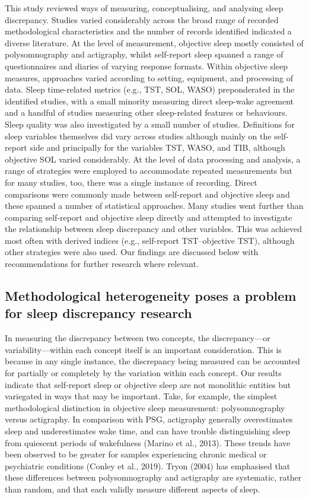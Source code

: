 \documentclass[
]{article}
\begin{document}
This study reviewed ways of measuring, conceptualising, and analysing sleep discrepancy. Studies varied considerably across the broad range of recorded methodological characteristics and the number of records identified indicated a diverse literature. At the level of measurement, objective sleep mostly consisted of polysomnography and actigraphy, whilst self-report sleep spanned a range of questionnaires and diaries of varying response formats. Within objective sleep measures, approaches varied according to setting, equipment, and processing of data. Sleep time-related metrics (e.g., TST, SOL, WASO) preponderated in the identified studies, with a small minority measuring direct sleep-wake agreement and a handful of studies measuring other sleep-related features or behaviours. Sleep quality was also investigated by a small number of studies. Definitions for sleep variables themselves did vary across studies although mainly on the self-report side and principally for the variables TST, WASO, and TIB, although objective SOL varied considerably. At the level of data processing and analysis, a range of strategies were employed to accommodate repeated measurements but for many studies, too, there was a single instance of recording. Direct comparisons were commonly made between self-report and objective sleep and these spanned a number of statistical approaches. Many studies went further than comparing self-report and objective sleep directly and attempted to investigate the relationship between sleep discrepancy and other variables. This was achieved most often with derived indices (e.g., self-report TST--objective TST), although other strategies were also used. Our findings are discussed below with recommendations for further research where relevant.

\subsection{Methodological heterogeneity poses a problem for sleep discrepancy research}\label{methodological-heterogeneity-poses-a-problem-for-sleep-discrepancy-research}

In measuring the discrepancy between two concepts, the discrepancy---or variability---within each concept itself is an important consideration. This is because in any single instance, the discrepancy being measured can be accounted for partially or completely by the variation within each concept. Our results indicate that self-report sleep or objective sleep are not monolithic entities but variegated in ways that may be important. Take, for example, the simplest methodological distinction in objective sleep measurement: polysomnography versus actigraphy. In comparison with PSG, actigraphy generally overestimates sleep and underestimates wake time, and can have trouble distinguishing sleep from quiescent periods of wakefulness (Marino et al., 2013). These trends have been observed to be greater for samples experiencing chronic medical or psychiatric conditions (Conley et al., 2019). Tryon (2004) has emphasised that these differences between polysomnography and actigraphy are systematic, rather than random, and that each validly measure different aspects of sleep.
\end{document}
